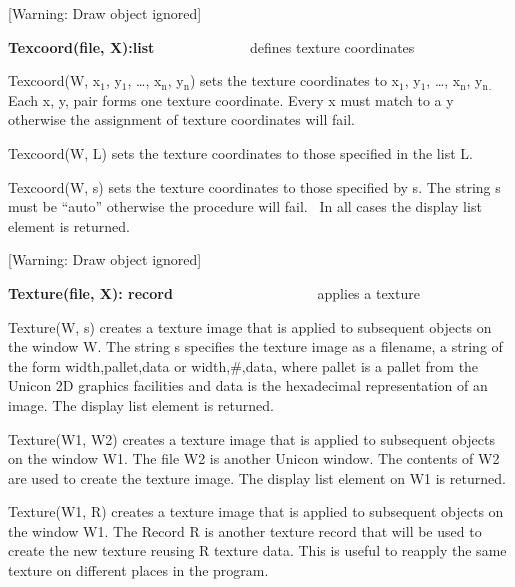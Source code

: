 \documentclass[letterpaper]{article}
\newcommand\textsubscript[1]{\ensuremath{{}_{\text{#1}}}}
\begin{document}
[Warning: Draw object ignored]

{
\textsf{\textbf{Texcoord(file, X):list}}\textbf{ }\ \ \ \ \ \ \ \ \ \  \ \ \ defines texture coordinates }


\bigskip

{
\textsf{Texcoord(W, x}\textsf{\textsubscript{1}}\textsf{, y}\textsf{\textsubscript{1}}\textsf{, {\dots},
x}\textsf{\textsubscript{n}}\textsf{, y}\textsf{\textsubscript{n}}\textsf{) }sets the texture coordinates to
\textsf{x}\textsf{\textsubscript{1}}\textsf{, y}\textsf{\textsubscript{1}}\textsf{, {\dots},
x}\textsf{\textsubscript{n}}\textsf{, y}\textsf{\textsubscript{n}}\texttt{\textsubscript{. }}Each x, y, pair forms one
texture coordinate. Every x must match to a y otherwise the assignment of texture coordinates will fail. }

{
\textsf{Texcoord(W, L)} sets the texture coordinates to those specified in the list \textsf{L}. }

{
\textsf{Texcoord(W, s) }sets the texture coordinates to those specified by \textsf{s}. The string \textsf{s} must be
\textsf{{}``auto''} otherwise the procedure will fail. \ In all cases the display list element is returned.}

[Warning: Draw object ignored]

{
\textsf{\textbf{Texture(file, X): record}} \ \ \ \ \ \ \ \ \ \ \ \  \ \ \ \ \ \ \ \ applies a texture }


\bigskip

{
\textsf{Texture(W, s) }creates a texture image that is applied to subsequent objects on the window \textsf{W}. The
string \textsf{s} specifies the texture image as a filename, a string of the form \textsf{width,pallet,data} or
\textsf{width,\#,data}, where pallet is a pallet from the Unicon 2D graphics facilities and data is the hexadecimal
representation of an image. The display list element is returned.}

{
\textsf{Texture(W1, W2) }creates a texture image that is applied to subsequent objects on the window \textsf{W1}. The
file \textsf{W2} is another Unicon window. The contents of \textsf{W2} are used to create the texture image. The
display list element on \textsf{W1} is returned. }

{
\textsf{Texture(W1, R) }creates a texture image that is applied to subsequent objects on the window \textsf{W1}. The
Record \textsf{R} is another texture record that will be used to create the new texture reusing R texture data. This is
useful to reapply the same texture on different places in the program.}
\end{document}
